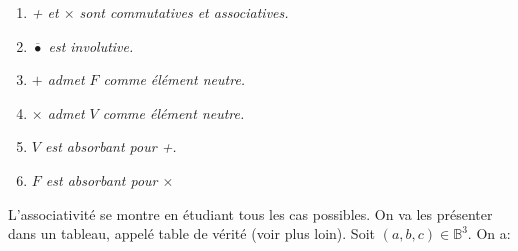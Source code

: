\documentclass{scrartcl}
\begin{document}
				\begin{enumerate}
				\item \textsl{+ et $\times$ sont commutatives et associatives.}
				\item \textsl{$\overline{\bullet}$ est involutive.}
				\item \textsl{$+$ admet $F$ comme élément neutre.}
				\item \textsl{$\times$ admet $V$ comme élément neutre.}
				\item \textsl{$V$ est absorbant pour +.}
				\item \textsl{$F$ est absorbant pour $\times$}
				\end{enumerate}
			\begin{demo}
				\item L'associativité se montre en étudiant tous les cas possibles. 
				On va les présenter dans un tableau, appelé table de vérité (voir plus loin). 
				Soit $(a,b,c) \in \mathbb{B}^3$. On a:
			\end{demo}
\end{document}
